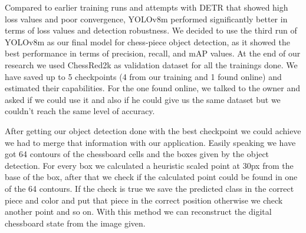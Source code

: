 Compared to earlier training runs and attempts with DETR that showed high loss values and poor convergence, YOLOv8m performed significantly better in terms of loss values and detection robustness.
We decided to use the third run of YOLOv8m as our final model for chess-piece object detection, as it showed the best performance in terms of precision, recall, and mAP values.
\newline
At the end of our research we used ChessRed2k as validation dataset for all the trainings done.
We have saved up to 5 checkpoints (4 from our training and 1 found online) and estimated their capabilities.
For the one found online, we talked to the owner and asked if we could use it and also if he could give us the same dataset but we couldn't reach the same level of accuracy.
\begin{table}[ht]
\centering
\caption{Final validation loss values for all the trainings done.}
\label{tab:yolov8:performance:final}
\end{table}

After getting our object detection done with the best checkpoint we could achieve we had to merge that information with our application.
Easily speaking we have got 64 contours of the chessboard cells and the boxes given by the object detection.
For every box we calculated a heuristic scaled point at 30px from the base of the box, after that we check if the calculated point could be found in one of the 64 contours.
If the check is true we save the predicted class in the correct piece and color and put that piece in the correct position otherwise we check another point and so on.
With this method we can reconstruct the digital chessboard state from the image given.